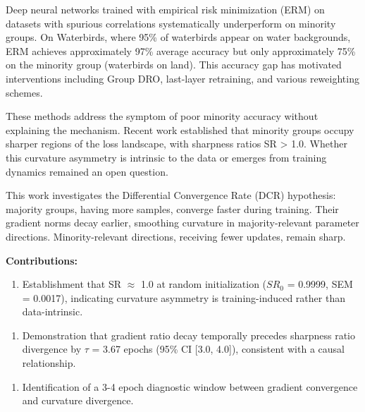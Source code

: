 
Deep neural networks trained with empirical risk minimization (ERM) on datasets with spurious correlations systematically underperform on minority groups. On Waterbirds, where 95\% of waterbirds appear on water backgrounds, ERM achieves approximately 97\% average accuracy but only approximately 75\% on the minority group (waterbirds on land). This accuracy gap has motivated interventions including Group DRO, last-layer retraining, and various reweighting schemes.

These methods address the symptom of poor minority accuracy without explaining the mechanism. Recent work established that minority groups occupy sharper regions of the loss landscape, with sharpness ratios SR > 1.0. Whether this curvature asymmetry is intrinsic to the data or emerges from training dynamics remained an open question.

This work investigates the Differential Convergence Rate (DCR) hypothesis: majority groups, having more samples, converge faster during training. Their gradient norms decay earlier, smoothing curvature in majority-relevant parameter directions. Minority-relevant directions, receiving fewer updates, remain sharp.

\textbf{Contributions:}

\begin{enumerate}
\item Establishment that SR $\approx$ 1.0 at random initialization ($SR_0$ = 0.9999, SEM = 0.0017), indicating curvature asymmetry is training-induced rather than data-intrinsic.
\end{enumerate}

\begin{enumerate}
\item Demonstration that gradient ratio decay temporally precedes sharpness ratio divergence by $\tau$ = 3.67 epochs (95\% CI [3.0, 4.0]), consistent with a causal relationship.
\end{enumerate}

\begin{enumerate}
\item Identification of a 3-4 epoch diagnostic window between gradient convergence and curvature divergence.
\end{enumerate}

